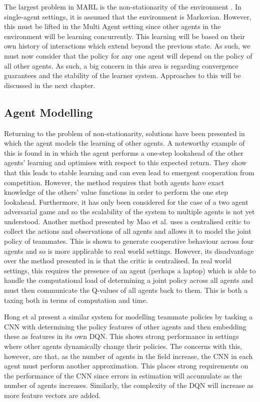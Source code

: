 \documentclass[preprint,11pt]{report}
\begin{document}
The largest problem in MARL is the non-stationarity of the environment \cite{Hernandez-LealA}. In
single-agent settings, it is assumed that the environment is Markovian. However, this must be lifted
in the Multi Agent setting since other agents in the environment will be learning concurrently. This
learning will be based on their own history of interactions which extend beyond the previous state.
As such, we must now consider that the policy for any one agent will depend on the policy of all
other agents. As such, a big concern in this area is regarding convergence guarantees and the
stability of the learner system. Approaches to this will be discussed in the next chapter. 

\subsection*{Agent Modelling}

Returning to the problem of non-stationarity, solutions have been presented in which the agent
models the learning of other agents. A noteworthy example of this is found in
\cite{Foerster2018LearningAwareness} in which the agent performs a one-step lookahead of the other
agents' learning and optimises with respect to this expected return. They show that this leads to
stable learning and can even lead to emergent cooperation from competition. However, the method
requires that both agents have exact knowledge of the others' value functions in order to perform
the one step lookahead. Furthermore, it has only been considered for the case of a two agent
adversarial game and so the scalability of the system to multiple agents is not yet understood.
Another method presented by Mao et al. \cite{MaoModellingDDPG} uses a centralised critic to collect
the actions and observations of all agents and allows it to model the joint policy of teammates.
This is shown to generate cooperative behaviour across four agents and so is more applicable to real
world settings. However, its disadvantage over the method presented in
\cite{Foerster2018LearningAwareness} is that the critic is centralised. In real world settings, this
requires the presence of an agent (perhaps a laptop) which is able to handle the computational load
of determining a joint policy across all agents and must then communicate the Q-values of all agents
back to them. This is both a taxing both in terms of computation and time. 

Hong et al \cite{Hong2018ASystems} present a similar system for modelling teammate policies by
tasking a CNN with determining the policy features of other agents and then embedding these as
features in its own DQN. This shows strong performance in settings where other agents dynamically
change their policies. The concerns with this, however, are that, as the number of agents in the
field increase, the CNN in each agent must perform another approximation. This places strong
requirements on the performance of the CNN since errors in estimation will accumulate as the number
of agents increases. Similarly, the complexity of the DQN will increase as more feature vectors are
added. 
\end{document}
